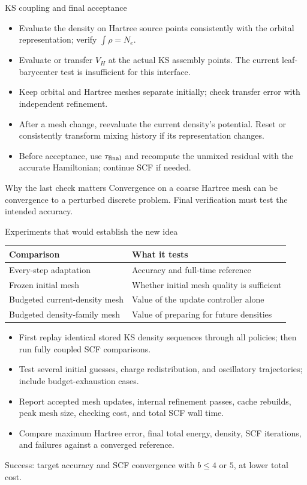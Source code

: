 \documentclass[aspectratio=169,10pt]{beamer}
\begin{document}
\begin{frame}{KS coupling and final acceptance}
\small
\begin{itemize}
\item Evaluate the density on Hartree source points consistently with the orbital representation; verify $\int\rho=N_e$.
\item Evaluate or transfer $V_H$ at the actual KS assembly points. The current leaf-barycenter test is insufficient for this interface.
\item Keep orbital and Hartree meshes separate initially; check transfer error with independent refinement.
\item After a mesh change, reevaluate the current density's potential. Reset or consistently transform mixing history if its representation changes.
\item Before acceptance, use $\tau_{\rm final}$ and recompute the unmixed residual with the accurate Hamiltonian; continue SCF if needed.
\end{itemize}
\begin{block}{Why the last check matters}
Convergence on a coarse Hartree mesh can be convergence to a perturbed discrete problem. Final verification must test the intended accuracy.
\end{block}
\end{frame}

\begin{frame}{Experiments that would establish the new idea}
\small
\begin{tabularx}{\textwidth}{lX}
\toprule
Comparison & What it tests\\\midrule
Every-step adaptation & Accuracy and full-time reference\\
Frozen initial mesh & Whether initial mesh quality is sufficient\\
Budgeted current-density mesh & Value of the update controller alone\\
Budgeted density-family mesh & Value of preparing for future densities\\
\bottomrule
\end{tabularx}
\medskip
\begin{itemize}
\item First replay identical stored KS density sequences through all policies; then run fully coupled SCF comparisons.
\item Test several initial guesses, charge redistribution, and oscillatory trajectories; include budget-exhaustion cases.
\item Report accepted mesh updates, internal refinement passes, cache rebuilds, peak mesh size, checking cost, and total SCF wall time.
\item Compare maximum Hartree error, final total energy, density, SCF iterations, and failures against a converged reference.
\end{itemize}
\alert{Success: target accuracy and SCF convergence with $b\le4$ or $5$, at lower total cost.}
\end{frame}
\end{document}
